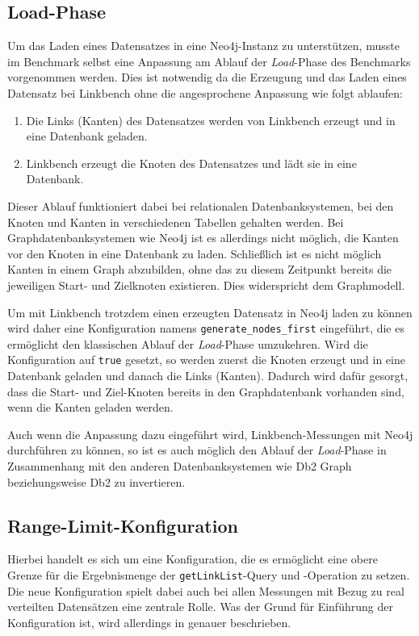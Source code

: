 \subsection{Load-Phase}
\label{implementierung:anpassung:load}
Um das Laden eines Datensatzes in eine Neo4j-Instanz zu unterstützen, musste im  Benchmark selbst eine Anpassung am Ablauf der \textit{Load}-Phase des Benchmarks vorgenommen werden. Dies ist notwendig da die Erzeugung und das Laden eines Datensatz bei Linkbench ohne die angesprochene Anpassung wie folgt ablaufen:
\begin{enumerate}
    \item Die Links (Kanten) des Datensatzes werden von Linkbench erzeugt und in eine Datenbank geladen. 
    \item Linkbench erzeugt die Knoten des Datensatzes und lädt sie in eine Datenbank. 
\end{enumerate}
Dieser Ablauf funktioniert dabei bei relationalen Datenbanksystemen, bei den Knoten und Kanten in verschiedenen Tabellen gehalten werden. Bei Graphdatenbanksystemen wie Neo4j ist es allerdings nicht möglich, die Kanten vor den Knoten in eine Datenbank zu laden. Schließlich ist es nicht möglich Kanten in einem Graph abzubilden, ohne das zu diesem Zeitpunkt bereits die jeweiligen Start- und Zielknoten existieren. Dies widerspricht dem Graphmodell.

Um mit Linkbench trotzdem einen erzeugten Datensatz in Neo4j laden zu können wird daher eine Konfiguration namens \texttt{generate\_nodes\_first} eingeführt, die es ermöglicht den klassischen Ablauf der \textit{Load}-Phase umzukehren. Wird die Konfiguration auf \texttt{true} gesetzt, so werden zuerst die Knoten erzeugt und in eine Datenbank geladen und danach die Links (Kanten). Dadurch wird dafür gesorgt, dass die Start- und Ziel-Knoten bereits in den Graphdatenbank vorhanden sind, wenn die Kanten geladen werden. 

Auch wenn die Anpassung dazu eingeführt wird, Linkbench-Messungen mit Neo4j durchführen zu können, so ist es auch möglich den Ablauf der \textit{Load}-Phase in Zusammenhang mit den anderen Datenbanksystemen wie Db2 Graph beziehungsweise Db2 zu invertieren. 

\subsection{Range-Limit-Konfiguration}
\label{implementierung:anpassung:limit}
Hierbei handelt es sich um eine Konfiguration, die es ermöglicht eine obere Grenze für die Ergebnismenge der \texttt{getLinkList}-Query und -Operation zu setzen. Die neue Konfiguration spielt dabei auch bei allen Messungen mit Bezug zu real verteilten Datensätzen eine zentrale Rolle. Was der Grund für Einführung der Konfiguration ist, wird allerdings in  genauer beschrieben. 

